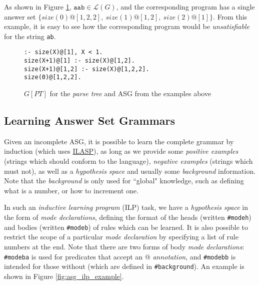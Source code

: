 As shown in Figure \ref{fig:asg_tree_program_example}, $\texttt{aab} \in \mathcal{L}(G)$, and the corresponding program has a single answer set $\{size(0)@[1,2,2],\ size(1)@[1,2],\ size(2)@[1]\}$. From this example, it is easy to see how the corresponding program would be \textit{unsatisfiable} for the string \texttt{ab}.

\begin{figure}[H]
\centering
\texttt{:- size(X)@[1], X < 1. \\
           size(X+1)@[1] :- size(X)@[1,2]. \\
           size(X+1)@[1,2] :- size(X)@[1,2,2]. \\
           size(0)@[1,2,2].}
\caption{$G[PT]$ for the \textit{parse tree} and ASG from the examples above}
\label{fig:asg_tree_program_example}
\end{figure}

\subsection{Learning Answer Set Grammars}

Given an incomplete ASG, it is possible to learn the complete grammar by induction (which uses \href{http://www.ilasp.com}{ILASP}), as long as we provide some \textit{positive examples} (strings which should conform to the language), \textit{negative examples}  (strings which must not), as well as a \textit{hypothesis space} and usually some \textit{background} information. Note that the \textit{background} is only used for ``global" knowledge, such as defining what is a number, or how to increment one. \cite{law_representing_2019}

In such an \textit{inductive learning program} (ILP) task, we have a \textit{hypothesis space} in the form of \textit{mode declarations}, defining the format of the heads (written \texttt{\#modeh}) and bodies (written \texttt{\#modeb}) of rules which can be learned. It is also possible to restrict the scope of a particular \textit{mode declaration} by specifying a list of rule numbers at the end. Note that there are two forms of body \textit{mode declarations}: \texttt{\#modeba} is used for predicates that accept an $@$ \textit{annotation}, and \texttt{\#modebb} is intended for those without (which are defined in \texttt{\#background}). An example is shown in Figure \ref{fig:asg_ilp_example}.

